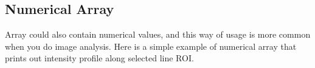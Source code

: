 \subsection{Numerical Array}
\label{subsec:numericalarray}

Array could also contain numerical values, and this way of usage is more common when you do image analysis. Here is a simple example of numerical array that prints out intensity profile along selected line ROI.